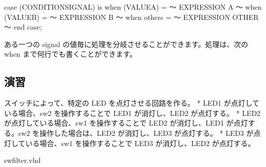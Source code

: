 \documentclass[letterpaper,10pt,dvipdfmx]{sphinxmanual}
\begin{document}
\begin{sphinxVerbatim}[commandchars=\\\{\}]
case (CONDITION\PYGZus{}SIGNAL) is
  when (VALUE\PYGZus{}A) =\PYGZgt{} ～ EXPRESSION A ～
  when (VALUE\PYGZus{}B) =\PYGZgt{} ～ EXPRESSION B ～
  when others =\PYGZgt{} ～ EXPRESSION OTHER ～
end case;
\end{sphinxVerbatim}

ある一つの signal の値毎に処理を分岐させることができます。処理は、次の when まで何行でも書くことができます。


\subsection{演習}
\label{\detokenize{05_try:id29}}
スイッチによって、特定の LED を点灯させる回路を作る。
* LED1 が点灯している場合、sw2 を操作することで LED1 が消灯し、LED2 が点灯する。
* LED2 が点灯している場合、sw1 を操作することで LED2 が消灯し、LED1 が点灯する。sw2 を操作した場合は、LED2 が消灯し、LED3 が点灯する。
* LED3 が点灯している場合、sw1 を操作することで LED3 が消灯し、LED2 が点灯する。

swfilter.vhd
\end{document}
